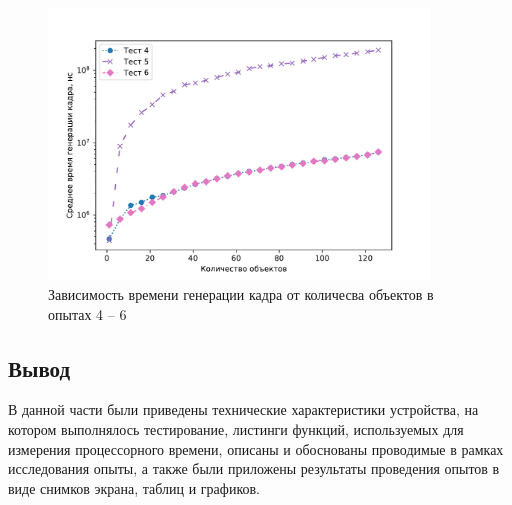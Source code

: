 \begin{figure}[H]
	\centering
    \includegraphics[width=0.9\textwidth]{img/456/plot_time.pdf}
	\caption{Зависимость времени генерации кадра от количесва объектов в опытах 4 -- 6}
	\label{fig:456:time}
\end{figure}



\subsection{Вывод}

В данной части были приведены технические характеристики устройства, на котором выполнялось тестирование, листинги функций, используемых для измерения процессорного времени, описаны и обоснованы проводимые в рамках исследования опыты, а также были приложены результаты проведения опытов в виде снимков экрана, таблиц и графиков.

